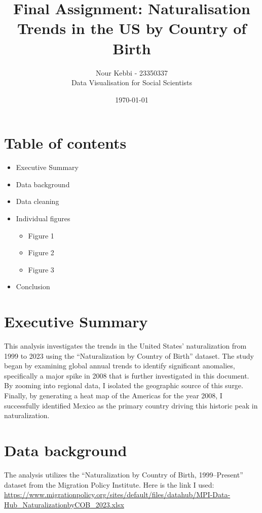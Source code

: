 \documentclass[12pt,letterpaper]{article}
\title{Final Assignment: Naturalisation Trends in the US by Country of Birth}
\author{Nour Kebbi - 23350337 \\ Data Visualisation for Social Scientists}
\date{\today}
\newcommand{\tocarrow}{\ding{224}\quad}
\begin{document}
\maketitle

\section*{Table of contents}
\begin{itemize}
    \item Executive Summary 
    \item Data background 
    \item Data cleaning 
    \item Individual figures 
    \begin{itemize}
        \item[\tocarrow] Figure 1 
        \item[\tocarrow] Figure 2 
        \item[\tocarrow] Figure 3 
    \end{itemize}
    \item Conclusion 
\end{itemize}

\newpage
{} 

\section{Executive Summary}
This analysis investigates the trends in the United States' naturalization from 1999 to 2023 using the “Naturalization by Country of Birth” dataset. The study began by examining global annual trends to identify significant anomalies, specifically a major spike in 2008 that is further investigated in this document. By zooming into regional data, I isolated the geographic source of this surge. Finally, by generating a heat map of the Americas for the year 2008, I successfully identified Mexico as the primary country driving this historic peak in naturalization.

\section{Data background}
The analysis utilizes the ``Naturalization by Country of Birth, 1999--Present'' dataset from the Migration Policy Institute. Here is the link I used: \url{https://www.migrationpolicy.org/sites/default/files/datahub/MPI-Data-Hub_NaturalizationbyCOB_2023.xlsx}
\end{document}
